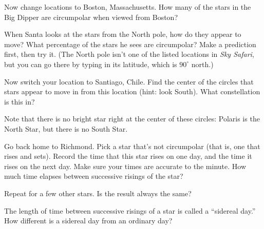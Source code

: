 \vskip 1in

Now change locations to Boston, Massachusetts.  How many of the stars
in the Big Dipper are circumpolar when viewed from Boston?

\vskip 1in

When Santa looks at the stars from the North pole, how do they
appear to move?  What percentage of the stars he sees are circumpolar?
Make a prediction first, then try it. (The North pole isn't one
of the listed locations in \textit{Sky Safari}, but you can go there
by typing in its latitude, which is $90^\circ$ north.)

\vskip 1in

Now switch your location to Santiago, Chile.  Find the center of the
circles that stars appear to move in from this location (hint: look South).
What constellation is this in?

\vskip 1in

Note that there is no bright star right at the center of these circles:
Polaris is the North Star, but there is no South Star.

Go back home to Richmond.
Pick a star that's not circumpolar (that is, one that rises and sets).
Record the time that this star rises on one day, and the time it
rises on the next day.  Make sure your times are accurate to the minute.
How much time elapses between successive risings of the star?

\vskip 1in

Repeat for a few other stars.  Is the result always the same?

\vskip 1in


The length of time between successive risings of a star is called a
``sidereal day.''  How different is a sidereal day from  an ordinary
day?

